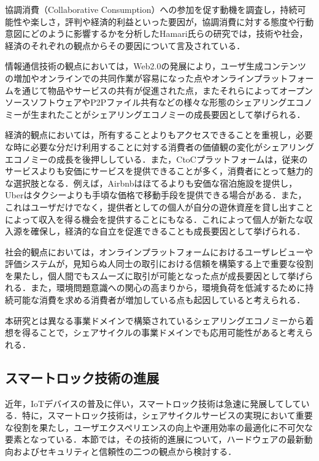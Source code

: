           \par 協調消費（Collaborative Consumption）への参加を促す動機を調査し，持続可能性や楽しさ，評判や経済的利益といった要因が，協調消費に対する態度や行動意図にどのように影響するかを分析したHamari氏らの研究では，技術や社会，経済のそれぞれの観点からその要因について言及されている．
          \par 情報通信技術の観点においては，Web2.0の発展により，ユーザ生成コンテンツの増加やオンラインでの共同作業が容易になった点やオンラインプラットフォームを通じて物品やサービスの共有が促進された点，またそれらによってオープンソースソフトウェアやP2Pファイル共有などの様々な形態のシェアリングエコノミーが生まれたことがシェアリングエコノミーの成長要因として挙げられる．
          \par 経済的観点においては，所有することよりもアクセスできることを重視し，必要な時に必要な分だけ利用することに対する消費者の価値観の変化がシェアリングエコノミーの成長を後押ししている．また，CtoCプラットフォームは，従来のサービスよりも安価にサービスを提供できることが多く，消費者にとって魅力的な選択肢となる．例えば，Airbnbはほてるよりも安価な宿泊施設を提供し，Uberはタクシーよりも手頃な価格で移動手段を提供できる場合がある．また，これはユーザだけでなく，提供者としての個人が自分の遊休資産を貸し出すことによって収入を得る機会を提供することにもなる．これによって個人が新たな収入源を確保し，経済的な自立を促進できることも成長要因として挙げられる．
          \par 社会的観点においては，オンラインプラットフォームにおけるユーザレビューや評価システムが，見知らぬ人同士の取引における信頼を構築する上で重要な役割を果たし，個人間でもスムーズに取引が可能となった点が成長要因として挙げられる．また，環境問題意識への関心の高まりから，環境負荷を低減するために持続可能な消費を求める消費者が増加している点も起因していると考えられる．
          \par 本研究とは異なる事業ドメインで構築されているシェアリングエコノミーから着想を得ることで，シェアサイクルの事業ドメインでも応用可能性があると考えられる．
      
  \subsection{スマートロック技術の進展}
    \label{sec:スマートロック技術の進展}
      \par 近年，IoTデバイスの普及に伴い，スマートロック技術は急速に発展してしている．特に，スマートロック技術は，シェアサイクルサービスの実現において重要な役割を果たし，ユーザエクスペリエンスの向上や運用効率の最適化に不可欠な要素となっている．本節では，その技術的進展について，ハードウェアの最新動向およびセキュリティと信頼性の二つの観点から検討する．


